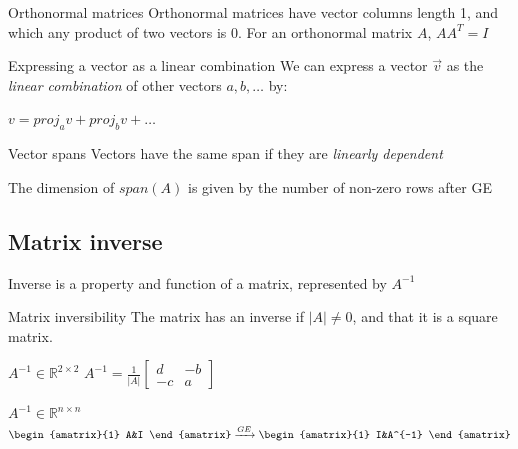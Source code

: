 \documentclass{article}
\begin{document}
\begin{definition}[]{Orthonormal matrices}
    Orthonormal matrices have vector columns length 1, and which any product of two vectors is 0.
    For an orthonormal matrix $A$, $AA^T = I$
\end{definition}
\begin{knBox}[]{Expressing a vector as a linear combination}
    We can express a vector $\vec{v}$ as the \emph{linear combination} of other vectors $a, b, \dots$ by:

    $v = proj_av + proj_bv + \dots$
\end{knBox}
\begin{knBox}[]{Vector spans}
    Vectors have the same span if they are \emph{linearly dependent}

    The dimension of $span(A)$ is given by the number of non-zero rows after GE
\end{knBox}

\subsection{Matrix inverse}
\label{sec:inv}
Inverse is a property and function of a matrix, represented by $A^{-1}$
\begin{definition}[]{Matrix inversibility}
    The matrix has an inverse if $|A|\ne 0$, and that it is a square matrix.
\end{definition}
\begin{knBox}[]{$A^{-1} \in \mathds{R}^{2\times 2}$}
    $A^{-1} = \frac{1}{|A|}\begin{bmatrix}
            d & -b \\-c &a
        \end{bmatrix}$
\end{knBox}
\begin{knBox}[]{$A^{-1} \in \mathds{R}^{n\times n}$}
    $\begin{amatrix}{1}
            A&I
        \end{amatrix}\xrightarrow{GE}\begin{amatrix}{1}
            I&A^{-1}
        \end{amatrix}$
\end{knBox}
\end{document}
